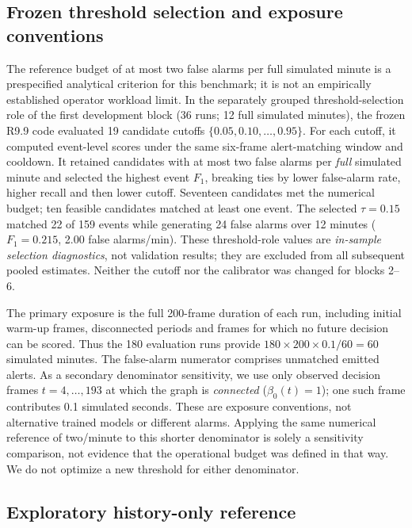 \documentclass[10pt,a4paper]{article}
\begin{document}
\subsection{Frozen threshold selection and exposure conventions}

The reference budget of at most two false alarms per full simulated minute is a prespecified analytical criterion for this benchmark; it is not an empirically established operator workload limit. In the separately grouped threshold-selection role of the first development block (36 runs; 12 full simulated minutes), the frozen R9.9 code evaluated 19 candidate cutoffs $\{0.05,0.10,\ldots,0.95\}$. For each cutoff, it computed event-level scores under the same six-frame alert-matching window and cooldown. It retained candidates with at most two false alarms per \emph{full} simulated minute and selected the highest event $F_1$, breaking ties by lower false-alarm rate, higher recall and then lower cutoff. Seventeen candidates met the numerical budget; ten feasible candidates matched at least one event. The selected $\tau=0.15$ matched 22 of 159 events while generating 24 false alarms over 12 minutes ($F_1=0.215$, 2.00 false alarms/min). These threshold-role values are \emph{in-sample selection diagnostics}, not validation results; they are excluded from all subsequent pooled estimates. Neither the cutoff nor the calibrator was changed for blocks 2--6.

The primary exposure is the full 200-frame duration of each run, including initial warm-up frames, disconnected periods and frames for which no future decision can be scored. Thus the 180 evaluation runs provide $180\times 200\times 0.1/60=60$ simulated minutes. The false-alarm numerator comprises unmatched emitted alerts. As a secondary denominator sensitivity, we use only observed decision frames $t=4,\ldots,193$ at which the graph is \emph{connected} ($\beta_0(t)=1$); one such frame contributes 0.1 simulated seconds. These are exposure conventions, not alternative trained models or different alarms. Applying the same numerical reference of two/minute to this shorter denominator is solely a sensitivity comparison, not evidence that the operational budget was defined in that way. We do not optimize a new threshold for either denominator.

\subsection{Exploratory history-only reference}
\end{document}
